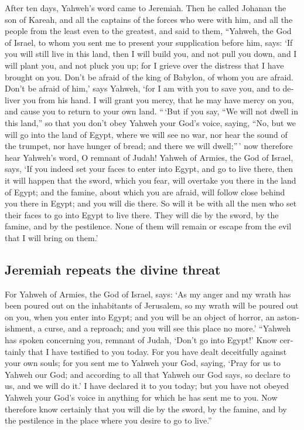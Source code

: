 \begin{paracol}{2}
\begin{otherlanguage}{english}
 After ten days, Yahweh's word came to Jeremiah.
 Then he called Johanan the son of Kareah, and all the
captains of the forces who were with him, and all the people from the
least even to the greatest,  and said to them, ``Yahweh,
the God of Israel, to whom you sent me to present your supplication
before him, says:  `If you will still live in this land,
then I will build you, and not pull you down, and I will plant you, and
not pluck you up; for I grieve over the distress that I have brought on
you.  Don't be afraid of the king of Babylon, of whom you
are afraid. Don't be afraid of him,' says Yahweh, `for I am with you to
save you, and to deliver you from his hand.  I will grant
you mercy, that he may have mercy on you, and cause you to return to
your own land.  ``\,`But if you say, ``We will not dwell
in this land,'' so that you don't obey Yahweh your God's voice,
 saying, ``No, but we will go into the land of Egypt,
where we will see no war, nor hear the sound of the trumpet, nor have
hunger of bread; and there we will dwell;''\,'  now
therefore hear Yahweh's word, O remnant of Judah! Yahweh of Armies, the
God of Israel, says, `If you indeed set your faces to enter into Egypt,
and go to live there,  then it will happen that the
sword, which you fear, will overtake you there in the land of Egypt; and
the famine, about which you are afraid, will follow close behind you
there in Egypt; and you will die there.  So will it be
with all the men who set their faces to go into Egypt to live there.
They will die by the sword, by the famine, and by the pestilence. None
of them will remain or escape from the evil that I will bring on them.'

\hypertarget{jeremiah-repeats-the-divine-threat}{%
\subsection{Jeremiah repeats the divine
threat}\label{jeremiah-repeats-the-divine-threat}}

 For Yahweh of Armies, the God of Israel, says: `As my
anger and my wrath has been poured out on the inhabitants of Jerusalem,
so my wrath will be poured out on you, when you enter into Egypt; and
you will be an object of horror, an astonishment, a curse, and a
reproach; and you will see this place no more.'  ``Yahweh
has spoken concerning you, remnant of Judah, `Don't go into Egypt!' Know
certainly that I have testified to you today.  For you
have dealt deceitfully against your own souls; for you sent me to Yahweh
your God, saying, `Pray for us to Yahweh our God; and according to all
that Yahweh our God says, so declare to us, and we will do it.'
 I have declared it to you today; but you have not obeyed
Yahweh your God's voice in anything for which he has sent me to you.
 Now therefore know certainly that you will die by the
sword, by the famine, and by the pestilence in the place where you
desire to go to live.''


\end{otherlanguage}
\end{paracol}
